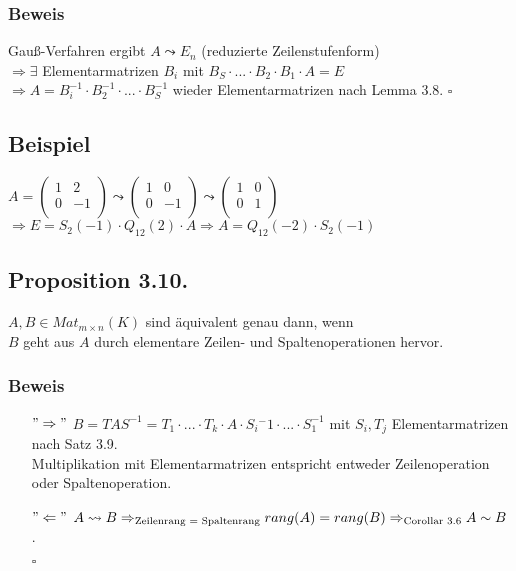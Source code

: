 \documentclass[a4paper,twoside]{article}
\newcommand{\tn}[1]{\textnormal {#1}}
\begin{document}
\subsubsection*{Beweis}
Gauß-Verfahren ergibt $A \leadsto E_n$ (reduzierte Zeilenstufenform)\\
$\Rightarrow \exists$ Elementarmatrizen $B_i$ mit $B_S\cdot ... \cdot B_2 \cdot B_1 \cdot A = E$\\
$\Rightarrow A = B_i^{-1} \cdot B_2^{-1} \cdot ... \cdot B_S^{-1}$ wieder Elementarmatrizen nach Lemma 3.8. $\square$

\subsection*{Beispiel}
$A=
\left( \begin{matrix}
1 & 2 \\
0 & -1 \\
\end{matrix} \right) \leadsto
\left( \begin{matrix}
1 & 0 \\
0 & -1 \\
\end{matrix} \right) \leadsto
\left( \begin{matrix}
1 & 0 \\
0 & 1 \\
\end{matrix} \right)
$\\
$
\Rightarrow E = S_2(-1) \cdot Q_{12}(2) \cdot A \Rightarrow A = Q_{12}(-2) \cdot S_2(-1)$

\subsection*{Proposition 3.10.}
$A,B \in Mat_{m\times n}(K)$ sind äquivalent genau dann, wenn \\
$B$ geht aus $A$ durch elementare Zeilen- und Spaltenoperationen hervor.\\

\subsubsection*{Beweis}
\begin{itemize}
\item[$"\Rightarrow"$]$ B = TAS^{-1} = T_1\cdot ... \cdot T_k \cdot A \cdot S_i{^-1} \cdot ... \cdot S_1^{-1}$ mit $S_i, T_j$ Elementarmatrizen nach Satz 3.9.\\
Multiplikation mit Elementarmatrizen entspricht entweder Zeilenoperation oder Spaltenoperation.\\
\item[$"\Leftarrow"$]
$ A \leadsto B \Rightarrow_{\tn{Zeilenrang = Spaltenrang}} rang(A) = rang(B) \Rightarrow_{\tn{Corollar 3.6}} A \sim B$.\\
\begin{flushright}
$\square$
\end{flushright}
\end{itemize}
\end{document}
